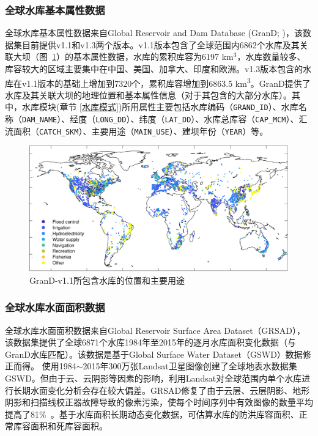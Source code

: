 \subsubsection{全球水库基本属性数据}
全球水库基本属性数据来自Global Reservoir and Dam Database (GranD; \citet{lehner2011high})，该数据集目前提供v1.1和v1.3两个版本。v1.1版本包含了全球范围内6862个水库及其关联大坝（图~\ref{fig:GranD-v1.1所包含水库的位置和主要用途}）的基本属性数据，水库的累积库容为6197 km$^{3}$，水库数量较多、库容较大的区域主要集中在中国、美国、加拿大、印度和欧洲。v1.3版本包含的水库在v1.1版本的基础上增加到7320个，累积库容增加到6863.5 \unit{km^3}。GranD提供了水库及其关联大坝的地理位置和基本属性信息（对于其包含的大部分水库）。其中，水库模块(章节 \ref{水库模式})所用属性主要包括水库编码（\texttt{GRAND\_ID}）、水库名称（\texttt{DAM\_NAME}）、经度（\texttt{LONG\_DD}）、纬度（\texttt{LAT\_DD}）、水库总库容（\texttt{CAP\_MCM}）、汇流面积（\texttt{CATCH\_SKM}）、主要用途（\texttt{MAIN\_USE}）、建坝年份（\texttt{YEAR}）等。

{
  \begin{figure}[htbp]
    \centering
    \includegraphics[width=\textwidth]{Figures/基础数据/GranD-v1.1所包含水库的位置和主要用途.pdf}
    \caption{GranD-v1.1所包含水库的位置和主要用途}
    \label{fig:GranD-v1.1所包含水库的位置和主要用途}
  \end{figure}
}


\subsubsection{全球水库水面面积数据}
全球水库水面面积数据来自Global Reservoir Surface Area Dataset（GRSAD），该数据集提供了全球6871个水库1984年至2015年的逐月水库面积变化数据（与GranD水库匹配）。该数据是基于Global Surface Water Dataset（GSWD）数据修正而得。\citet{pekel2016high} 使用1984$\sim$2015年300万张Landsat卫星图像创建了全球地表水数据集GSWD。但由于云、云阴影等因素的影响，利用Landsat对全球范围内单个水库进行长期水面变化分析会存在较大偏差。GRSAD修复了由于云层、云层阴影、地形阴影和扫描线校正器故障导致的像素污染，使每个时间序列中有效图像的数量平均提高了81\%~\citep{zhao2018automatic}。基于水库面积长期动态变化数据，可估算水库的防洪库容面积、正常库容面积和死库容面积。


